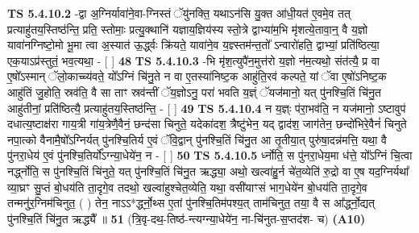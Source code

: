 \documentclass[17pt]{extarticle}
\begin{document}
                                \textbf{ TS 5.4.10.2} \newline
                  -द्वा अ॒ग्निर्यावा॑ने॒वा-ग्निस्तं ॅयु॑नक्ति॒ यथाऽन॑सि यु॒क्त आ॑धी॒यत॑ ए॒वमे॒व तत् प्रत्याहु॑तय॒स्तिष्ठ॑न्ति॒ प्रति॒ स्तोमाः॒ प्रत्यु॒क्थानि॑ यज्ञाय॒ज्ञिय॑स्य स्तो॒त्रे द्वाभ्या॑म॒भि मृ॑शत्ये॒तावा॒न्॒ वै य॒ज्ञो यावा॑नग्निष्टो॒मो भू॒मा त्वा अ॒स्यात॑ ऊ॒र्द्ध्वः क्रि॑यते॒ यावा॑ने॒व य॒ज्ञ्स्तम॑न्त॒तो᳚ ऽन्वारो॑हति॒ द्वाभ्यां॒ प्रति॑ष्ठित्या॒ एक॒याऽप्र॑स्तुतं॒ भव॒त्यथा॒ - [  ] \textbf{  48} \newline
                  \newline
                                \textbf{ TS 5.4.10.3} \newline
                  -भि मृ॑श॒त्युपै॑न॒मुत्त॑रो य॒ज्ञो न॑म॒त्यथो॒ संत॑त्यै॒ प्र वा ए॒षो᳚ऽस्मान् ॅलो॒काच्च्य॑वते॒ यो᳚ऽग्निं चि॑नु॒ते न वा ए॒तस्या॑निष्ट॒क आहु॑ति॒रव॑ कल्पते॒ यां ॅवा ए॒षो॑ऽनिष्ट॒क आहु॑तिं जु॒होति॒ स्रव॑ति॒ वै सा ताꣳ स्रव॑न्तीं ॅय॒ज्ञोऽनु॒ परा॑ भवति य॒ज्ञ्ं ॅयज॑मानो॒ यत् पु॑नश्चि॒तिं चि॑नु॒त आहु॑तीनां॒ प्रति॑ष्ठित्यै॒ प्रत्याहु॑तय॒स्तिष्ठ॑न्ति॒ - [  ] \textbf{  49} \newline
                  \newline
                                \textbf{ TS 5.4.10.4} \newline
                  न य॒ज्ञ्ः प॑रा॒भव॑ति॒ न यज॑मानो॒ ऽष्टावुप॑ दधात्य॒ष्टाक्ष॑रा गाय॒त्री गा॑य॒त्रेणै॒वैनं॒ छन्द॑सा चिनुते॒ यदेका॑दश॒ त्रैष्टु॑भेन॒ यद् द्वाद॑श॒ जाग॑तेन॒ छन्दो॑भिरे॒वैनं॑ चिनुते नपा॒त्को वैनामै॒षो᳚ऽग्निर्यत् पु॑नश्चि॒तिर्य ए॒वं ॅवि॒द्वान् पु॑नश्चि॒तिं चि॑नु॒त आ तृ॒तीया॒त् पुरु॑षा॒दन्न॑मत्ति॒ यथा॒ वै पु॑नरा॒धेय॑ ए॒वं पु॑नश्चि॒तिर्यो᳚ऽग्न्या॒धेये॑न॒ न - [  ] \textbf{  50} \newline
                  \newline
                                \textbf{ TS 5.4.10.5} \newline
                  र्ध्नोति॒ स पु॑नरा॒धेय॒मा ध॑त्ते॒ यो᳚ऽग्निं चि॒त्वा नर्द्ध्नोति॒ स पु॑नश्चि॒तिं चि॑नुते॒ यत् पु॑नश्चि॒तिं चि॑नु॒त ऋद्ध्या॒ अथो॒ खल्वा॑हु॒र्न चे॑त॒व्येति॑ रु॒द्रो वा ए॒ष यद॒ग्निर्यथा᳚ व्या॒घ्रꣳ सु॒प्तं बो॒धय॑ति ता॒दृगे॒व तदथो॒ खल्वा॑हुश्चेत॒व्येति॒ यथा॒ वसी॑याꣳसं भाग॒धेये॑न बो॒धय॑ति ता॒दृगे॒व तन्मनु॑र॒ग्निम॑चिनुत॒ ( ) तेन॒ नाऽऽ*र्द्ध्नो॒थ्स ए॒तां पु॑नश्चि॒तिम॑पश्य॒त् ताम॑चिनुत॒ तया॒ वै स आ᳚र्द्ध्नो॒द्यत् पु॑नश्चि॒तिं चि॑नु॒त ऋद्ध्यै᳚ ॥ \textbf{  51} \newline
                  \newline
                      (त्रि॒वृ-दथ॒-तिष्ठ॑-न्त्यग्न्या॒धेये॑न॒ ना-चि॑नुत-स॒प्तद॑श- च)  \textbf{(A10)} \newline \newline
\end{document}
